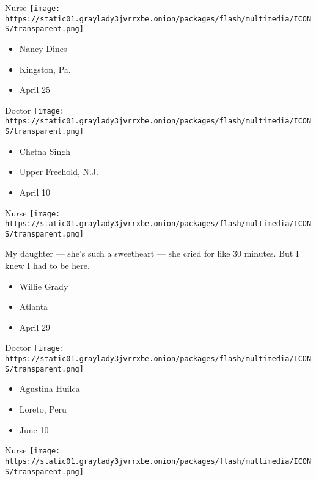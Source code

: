 \protect\hyperlink{item-nancy-dines}{}

Nurse
\texttt{[image: https://static01.graylady3jvrrxbe.onion/packages/flash/multimedia/ICONS/transparent.png]}

\begin{itemize}
\tightlist
\item
  Nancy Dines
\item
  Kingston, Pa.
\item
  April 25
\end{itemize}

\protect\hyperlink{item-chetna-singh}{}

Doctor
\texttt{[image: https://static01.graylady3jvrrxbe.onion/packages/flash/multimedia/ICONS/transparent.png]}

\begin{itemize}
\tightlist
\item
  Chetna Singh
\item
  Upper Freehold, N.J.
\item
  April 10
\end{itemize}

\protect\hyperlink{item-willie-grady}{}

Nurse
\texttt{[image: https://static01.graylady3jvrrxbe.onion/packages/flash/multimedia/ICONS/transparent.png]}

My daughter --- she's such a sweetheart --- she cried for like 30
minutes. But I knew I had to be here.

\begin{itemize}
\tightlist
\item
  Willie Grady
\item
  Atlanta
\item
  April 29
\end{itemize}

\protect\hyperlink{item-agustina-huilca}{}

Doctor
\texttt{[image: https://static01.graylady3jvrrxbe.onion/packages/flash/multimedia/ICONS/transparent.png]}

\begin{itemize}
\tightlist
\item
  Agustina Huilca
\item
  Loreto, Peru
\item
  June 10
\end{itemize}

\protect\hyperlink{item-ashley-luanne-kay-chermak}{}

Nurse
\texttt{[image: https://static01.graylady3jvrrxbe.onion/packages/flash/multimedia/ICONS/transparent.png]}

